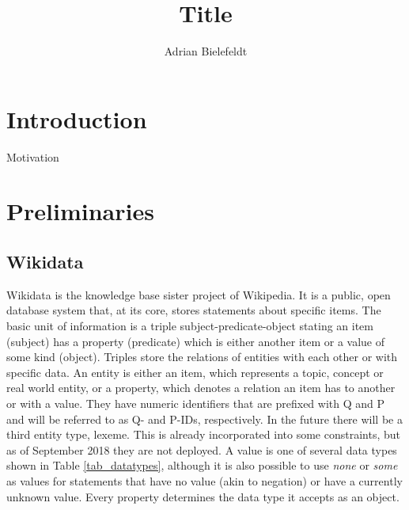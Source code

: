 \documentclass[hyperref,bachelorofscience,fleqn]{cgvpub}
\author{Adrian Bielefeldt}
\title{Title}
\begin{document}
\chapter{Introduction}
Motivation

\chapter{Preliminaries}

\section{Wikidata}
Wikidata is the knowledge base sister project of Wikipedia. It is a public, open database system that, at its core, stores statements about specific items. The basic unit of information is a triple subject-predicate-object stating an item (subject) has a property (predicate) which is either another item or a value of some kind (object). Triples store the relations of entities with each other or with specific data. An entity is either an item, which represents a topic, concept or real world entity, or a property, which denotes a relation an item has to another or with a value. They have numeric identifiers that are prefixed with Q and P and will be referred to as Q- and P-IDs, respectively. In the future there will be a third entity type, lexeme. This is already incorporated into some constraints, but as of September 2018 they are not deployed. A value is one of several data types shown in Table \ref{tab_datatypes}, although it is also possible to use \emph{none} or \emph{some} as values for statements that have no value (akin to negation) or have a currently unknown value. Every property determines the data type it accepts as an object. \\
\end{document}
